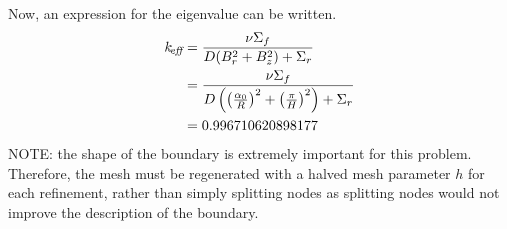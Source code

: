   Now, an expression for the eigenvalue can be written.
  \begin{align}
    k_{\!\mbox{\scriptsize \em eff}} &= \frac{\nu \Sigma_f}{D(B_r^2 + B_z^2) + \Sigma_r} \\
    &= \frac{\nu \Sigma_f}{D\left(\left(\frac{\alpha_0}{R}\right)^2 + 
      \left(\frac{\pi}{H}\right)^2 \right) + \Sigma_r} \\
    &= 0.996710620898177
  \end{align}
  NOTE: the shape of the boundary is extremely important for this  problem.
  Therefore, the mesh must be regenerated with a halved mesh parameter  $h$ for
  each refinement, rather than simply splitting nodes as splitting nodes would 
  not improve the description of the boundary.

